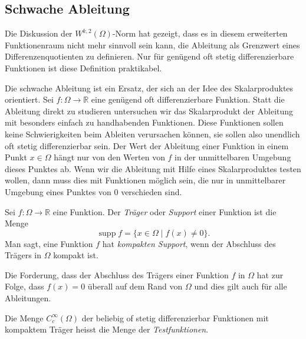 %
%
\subsection{Schwache Ableitung}
Die Diskussion der $W^{k,2}(\Omega)$-Norm hat gezeigt, dass es in diesem
erweiterten Funktionenraum nicht mehr sinnvoll sein kann, die Ableitung
als Grenzwert eines Differenzenquotienten zu definieren.
Nur für genügend oft stetig differenzierbare Funktionen ist diese
Definition praktikabel.

Die schwache Ableitung ist ein Ersatz, der sich an der Idee des
Skalarproduktes orientiert.
Sei $f\colon \Omega\to\mathbb{R}$ eine genügend oft differenzierbare
Funktion.
Statt die Ableitung direkt zu studieren untersuchen wir das Skalarprodukt
der Ableitung mit besonders einfach zu handhabenden Funktionen.
Diese Funktionen sollen keine Schwierigkeiten beim Ableiten
verursachen können, sie sollen also unendlich oft stetig differenzierbar
sein.
Der Wert der Ableitung einer Funktion in einem Punkt $x\in\Omega$ hängt nur 
von den Werten von $f$ in der unmittelbaren Umgebung dieses Punktes ab.
Wenn wir die Ableitung mit Hilfe eines Skalarproduktes testen wollen,
dann muss dies mit Funktionen möglich sein, die nur in unmittelbarer
Umgebung eines Punktes von $0$ verschieden sind.

\begin{definition}
Sei $f\colon\Omega\to\mathbb{R}$ eine Funktion.
Der {\em Träger} oder {\em Support} einer Funktion ist die
Menge
\[
\operatorname{supp} f = \{x\in\Omega\mid f(x)\ne 0\}.
\]
Man sagt, eine Funktion $f$ hat {\em kompakten Support}, wenn 
der Abschluss des Trägers in $\Omega$ kompakt ist.
\end{definition}

Die Forderung, dass der Abschluss des Trägers einer Funktion $f$
in $\Omega$ hat zur Folge, dass $f(x)=0$ überall auf dem Rand
von $\Omega$ und dies gilt auch für alle Ableitungen.

\begin{definition}
Die Menge $C_c^{\infty}(\Omega)$ der beliebig of stetig differenzierbar
Funktionen mit kompaktem Träger heisst die Menge der {\em Testfunktionen}.
\end{definition}

